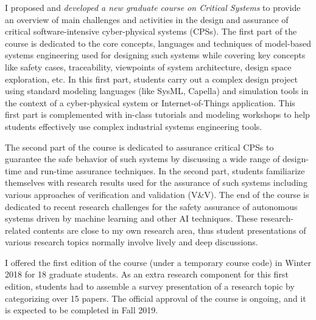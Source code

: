 \documentclass[a4paper,11pt]{report}
\begin{document}
I proposed and \emph{developed a new graduate course on Critical Systems} to provide an overview of main challenges and activities in the design and assurance of critical software-intensive cyber-physical systems (CPSs). The first part of the course is dedicated to the core concepts, languages and techniques of model-based systems engineering used for designing such systems while covering key concepts like safety cases, traceability, viewpoints of system architecture, design space exploration, etc. In this first part, students carry out a complex design project using standard modeling languages (like SysML, Capella) and simulation tools in the context of a cyber-physical system or Internet-of-Things application. This first part is complemented with in-class tutorials and modeling workshops to help students effectively use complex industrial systems engineering tools.

The second part of the course is dedicated to assurance critical CPSs to guarantee the safe behavior of such systems by discussing a wide range of design-time and run-time assurance techniques. In the second part, students familiarize themselves with research results used for the assurance of such systems including various approaches of verification and validation (V\&V). The end of the course is dedicated to recent research challenges for the safety assurance of autonomous systems driven by machine learning and other AI techniques. These research-related contents are close to my own research area, thus student presentations of various research topics normally involve lively and deep discussions. 

I offered the first edition of the course (under a temporary course code) in Winter 2018 for 18 graduate students. As an extra research component for this first edition, students had to assemble a survey presentation of a research topic by categorizing over 15 papers. The official approval of the course is ongoing, and it is expected to be completed in Fall 2019. 


\end{document}
